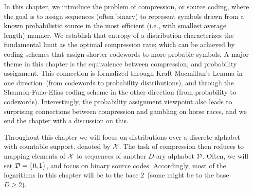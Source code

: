     In this chapter, we introduce the problem of compression, or source coding, where the goal is to assign sequences (often binary) to represent symbols drawn from a known probabilistic source in the most efficient (i.e., with smallest average length) manner. We establish that entropy of a distribution characterizes the fundamental limit as the optimal compression rate; which can be achieved by coding schemes that assign shorter codewords to more probable symbols. A major theme in this chapter is the equivalence between compression, and probability assignment. This connection is formalized through Kraft-Macmillan's Lemma in one direction~(from codewords to probability distributions), and through the Shannon-Fano-Elias coding scheme in the other direction (from probability to codewords). Interestingly, the probability assignment viewpoint also leads to surprising connections between compression and gambling on horse races, and we end the chapter with a discussion on this. 

    Throughout this chapter we will focus on distributions over a discrete alphabet with countable support, denoted by $\mathcal{X}$. The task of compression then reduces to mapping elements of $\mathcal{X}$ to sequences of another $D$-ary alphabet $\mathcal{D}$. Often, we will set $\mathcal{D} = \{0, 1\}$, and focus on binary source codes. Accordingly, most of the logarithms in this chapter will be to the base $2$~(some might be to the base $D \geq 2$). 
    
